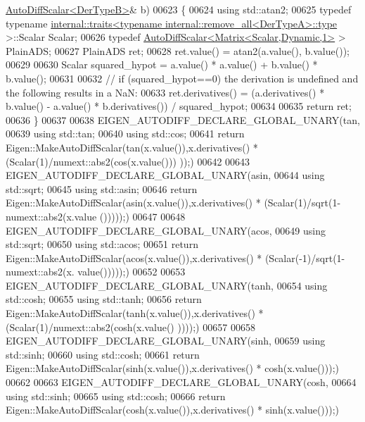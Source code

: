 \begin{DoxyCode}
      \hyperlink{class_eigen_1_1_auto_diff_scalar}{AutoDiffScalar<DerTypeB>}& b)
00623 \{
00624   \textcolor{keyword}{using} std::atan2;
00625   \textcolor{keyword}{typedef} \textcolor{keyword}{typename} 
      \hyperlink{struct_eigen_1_1internal_1_1traits}{internal::traits<typename internal::remove\_all<DerTypeA>::type}
      >::Scalar Scalar;
00626   \textcolor{keyword}{typedef} \hyperlink{class_eigen_1_1_auto_diff_scalar}{AutoDiffScalar<Matrix<Scalar,Dynamic,1>} > PlainADS;
00627   PlainADS ret;
00628   ret.value() = atan2(a.value(), b.value());
00629   
00630   Scalar squared\_hypot = a.value() * a.value() + b.value() * b.value();
00631   
00632   \textcolor{comment}{// if (squared\_hypot==0) the derivation is undefined and the following results in a NaN:}
00633   ret.derivatives() = (a.derivatives() * b.value() - a.value() * b.derivatives()) / squared\_hypot;
00634 
00635   \textcolor{keywordflow}{return} ret;
00636 \}
00637 
00638 EIGEN\_AUTODIFF\_DECLARE\_GLOBAL\_UNARY(tan,
00639   \textcolor{keyword}{using} std::tan;
00640   \textcolor{keyword}{using} std::cos;
00641   \textcolor{keywordflow}{return} Eigen::MakeAutoDiffScalar(tan(x.value()),x.derivatives() * (Scalar(1)/numext::abs2(cos(x.value()))
      ));)
00642 
00643 EIGEN\_AUTODIFF\_DECLARE\_GLOBAL\_UNARY(asin,
00644   \textcolor{keyword}{using} std::sqrt;
00645   \textcolor{keyword}{using} std::asin;
00646   \textcolor{keywordflow}{return} Eigen::MakeAutoDiffScalar(asin(x.value()),x.derivatives() * (Scalar(1)/sqrt(1-numext::abs2(x.value
      ()))));)
00647   
00648 EIGEN\_AUTODIFF\_DECLARE\_GLOBAL\_UNARY(acos,
00649   \textcolor{keyword}{using} std::sqrt;
00650   \textcolor{keyword}{using} std::acos;
00651   \textcolor{keywordflow}{return} Eigen::MakeAutoDiffScalar(acos(x.value()),x.derivatives() * (Scalar(-1)/sqrt(1-numext::abs2(x.
      value()))));)
00652 
00653 EIGEN\_AUTODIFF\_DECLARE\_GLOBAL\_UNARY(tanh,
00654   \textcolor{keyword}{using} std::cosh;
00655   \textcolor{keyword}{using} std::tanh;
00656   \textcolor{keywordflow}{return} Eigen::MakeAutoDiffScalar(tanh(x.value()),x.derivatives() * (Scalar(1)/numext::abs2(cosh(x.value()
      ))));)
00657 
00658 EIGEN\_AUTODIFF\_DECLARE\_GLOBAL\_UNARY(sinh,
00659   \textcolor{keyword}{using} std::sinh;
00660   \textcolor{keyword}{using} std::cosh;
00661   \textcolor{keywordflow}{return} Eigen::MakeAutoDiffScalar(sinh(x.value()),x.derivatives() * cosh(x.value()));)
00662 
00663 EIGEN\_AUTODIFF\_DECLARE\_GLOBAL\_UNARY(cosh,
00664   \textcolor{keyword}{using} std::sinh;
00665   \textcolor{keyword}{using} std::cosh;
00666   \textcolor{keywordflow}{return} Eigen::MakeAutoDiffScalar(cosh(x.value()),x.derivatives() * sinh(x.value()));)

\end{DoxyCode}
